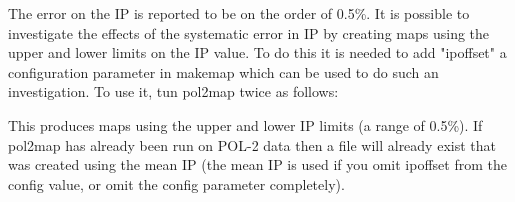 The error on the IP is reported to be on the order of 0.5\%.
It is possible to investigate the effects of the systematic
error in IP by creating maps using the upper and lower limits on the
IP value. To do this it is needed to add "ipoffset" a configuration 
parameter in makemap which can be used to do such an investigation. To
use it, tun pol2map twice as follows:

\begin{terminalv}
\end{terminalv}

This produces maps using the upper and lower IP limits (a range of
0.5\%). If pol2map has already been run on POL-2 data then a file 
will already exist that was created using the 
mean IP (the mean IP is used if you omit ipoffset from the config
value, or omit the  config parameter completely). 




